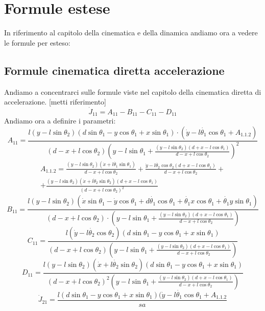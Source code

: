 \section{Formule estese}
In riferimento al capitolo della cinematica e della dinamica andiamo ora a vedere le formule per esteso:
\subsection{Formule cinematica diretta accelerazione}
Andiamo a concentrarci sulle formule viste nel capitolo della cinematica diretta di accelerazione. [metti riferimento]
\begin{equation}
\dot{J}_{11} = A_{11} - B_{11} - C_{11} - D_{11}
\end{equation}
Andiamo ora a definire i parametri: 
\begin{equation*}
A_{11} = \frac{l(y-l\sin\theta_{2})(d\sin\theta_{1}-y\cos\theta _{1}+x\sin\theta _{1})\cdot (\dot{y}-l\dot{\theta_1}\cos\theta _{1}+A_{1.1.2})}{(d-x+l\cos\theta_{2})(y-l\sin\theta_{1}+\frac{(y-l\sin\theta _{2})(d+x-l\cos\theta _{1})}{d-x+l\cos\theta _{2}})^2}
\end{equation*}
\begin{equation*}
\begin{split}
A_{1.1.2} = \frac{(y-l\sin\theta_{2})(\dot{x}+l\dot{\theta_1}\sin\theta_{1})}{d-x+l\cos\theta_{2}}+\frac{\dot{y}-l\dot{\theta_2}\cos\theta_{2}(d+x-l\cos\theta_{1})}{d-x+l\cos\theta_{2}}+  \\
+ \frac{(y-l\sin\theta_{2})(\dot{x}+l\dot{\theta}_{2}\sin\theta_{2})(d+x-l\cos\theta_{1})}{{(d-x+l\cos\theta_{2})}^2}
\end{split}
\end{equation*}
\begin{equation*}
B_{11} =\frac{l(y-l\sin\theta_{2})(\dot{x}\sin\theta_{1}-\dot{y}\cos\theta_{1}+d\dot{\theta_1}\cos\theta_{1}+\dot{\theta_1}x\cos\theta_{1}+\dot{\theta_{1}}y\sin\theta _{1})}{(d-x+l\cos\theta_{2})\cdot(y-l\sin\theta_{1}+\frac{(y-l\sin\theta_{2})(d+x-l\cos\theta_{1})}{d-x+l\cos\theta_{2}})}
\end{equation*}
\begin{equation*}
C_{11} = \frac{l(\dot{y}-l\dot{\theta_{2}}\cos\theta_{2})(d\sin\theta_{1}
    -y\cos\theta_{1}+x\sin\theta_{1})}{(d-x+l\cos\theta_{2})(y-l\sin\theta_{1}+\frac{(y-l\sin\theta_{2})
    (d+x-l\cos\theta_{1})}{d-x+l\cos\theta_{2}})}
\end{equation*}
\begin{equation*}
D_{11} = \frac{l(y-l\sin\theta_{2})(\dot{x}+l\dot{\theta_2}\sin\theta_{2})
    (d\sin\theta_{1}-y\cos\theta_{1}+x\sin\theta_{1})}{(d-x+l\cos\theta_{2})^2(y-l\sin\theta_{1}+\frac{(y-l\sin\theta_{2})
    (d+x-l\cos\theta_{1})}{d-x+l\cos\theta _{2}})}
\end{equation*}
\begin{equation}
\dot{J}_{21} =\frac{l(d\sin\theta_{1}-y\cos\theta_{1}+x\sin\theta_{1})(\dot{y}-
 l\dot{\theta_1}\cos\theta_{1}+A_{1.1.2}}{sa}
\end{equation}
